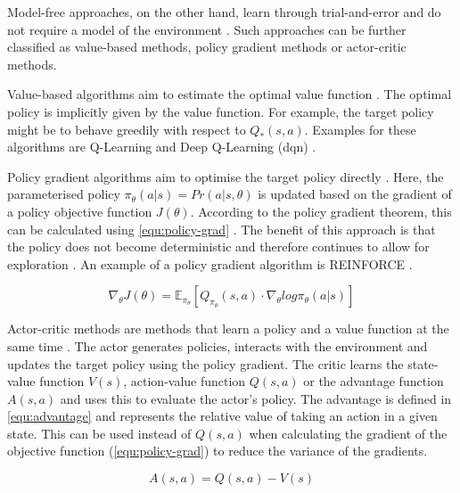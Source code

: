 Model-free approaches, on the other hand, learn through trial-and-error and do not require a model of the environment \parencite{SuttonBarto_2018}. Such approaches can be further classified as value-based methods, policy gradient methods or actor-critic methods.

Value-based algorithms aim to estimate the optimal value function \parencite{Wang_2022}. The optimal policy is implicitly given by the value function. For example, the target policy might be to behave greedily with respect to $Q_*(s, a)$. Examples for these algorithms are Q-Learning \parencite{Watkins_1992} and Deep Q-Learning (\gls{dqn}) \parencite{Mnih_2015}.

Policy gradient algorithms aim to optimise the target policy directly \parencite{Wang_2022}. Here, the parameterised policy $\pi_\theta(a|s)=Pr(a|s, \theta)$ is updated based on the gradient of a policy objective function $J(\theta)$. According to the policy gradient theorem, this can be calculated using \autoref{equ:policy-grad} \parencite{silver2015}. The benefit of this approach is that the policy does not become deterministic and therefore continues to allow for exploration \parencite{SuttonBarto_2018}. An example of a policy gradient algorithm is REINFORCE \parencite{Williams_1992}.

\begin{equation}
\label{equ:policy-grad}
\nabla_\theta J(\theta)=\mathbb{E}_{\pi_\theta}[Q_{\pi_\theta}(s, a)\cdot\nabla_\theta log\pi_\theta(a|s)]
\end{equation}

Actor-critic methods are methods that learn a policy and a value function at the same time \parencite{Wang_2022}. The actor generates policies, interacts with the environment and updates the target policy using the policy gradient. The critic learns the state-value function $V(s)$, action-value function $Q(s, a)$ or the advantage function $A(s, a)$ and uses this to evaluate the actor's policy. The advantage is defined in \autoref{equ:advantage} and represents the relative value of taking an action in a given state. This can be used instead of $Q(s, a)$ when calculating the gradient of the objective function (\autoref{equ:policy-grad}) to reduce the variance of the gradients.

\begin{equation}
\label{equ:advantage}
A(s, a)=Q(s, a)-V(s)
\end{equation}


